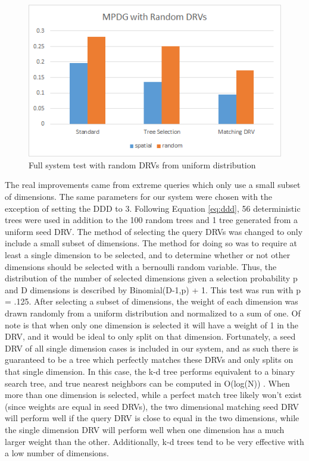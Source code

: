 \begin{figure}[h]
\begin{center}
\includegraphics[width=.85\textwidth]{Figures/fullsysrand}
\end{center}
\caption{Full system test with random DRVs from uniform distribution}
\label{fig:fullsysrand}
\end{figure}

The real improvements came from extreme queries which only use a small subset of dimensions.  The same parameters for our system were chosen with the exception of setting the DDD to 3.  Following Equation \ref{eq:ddd}, 56 deterministic trees were used in addition to the 100 random trees and 1 tree generated from a uniform seed DRV.  The method of selecting the query DRVs was changed to only include a small subset of dimensions.  The method for doing so was to require at least a single dimension to be selected, and to determine whether or not other dimensions should be selected with a bernoulli random variable.  Thus, the distribution of the number of selected dimensions given a selection probability p and D dimensions is described by Binomial(D-1,p) + 1.  This test was run with p = .125.  After selecting a subset of dimensions, the weight of each dimension was drawn randomly from a uniform distribution and normalized to a sum of one.  Of note is that when only one dimension is selected it will have a weight of 1 in the DRV, and it would be ideal to only split on that dimension.  Fortunately, a seed DRV of all single dimension cases is included in our system, and as such there is guaranteed to be a tree which perfectly matches these DRVs and only splits on that single dimension.  In this case, the k-d tree performs equivalent to a binary search tree, and true nearest neighbors can be computed in O(log(N)) \citep{ahmadbinary}.  When more than one dimension is selected, while a perfect match tree likely won't exist (since weights are equal in seed DRVs), the two dimensional matching seed DRV will perform well if the query DRV is close to equal in the two dimensions, while the single dimension DRV will perform well when one dimension has a much larger weight than the other.  Additionally, k-d trees tend to be very effective with a low number of dimensions.

